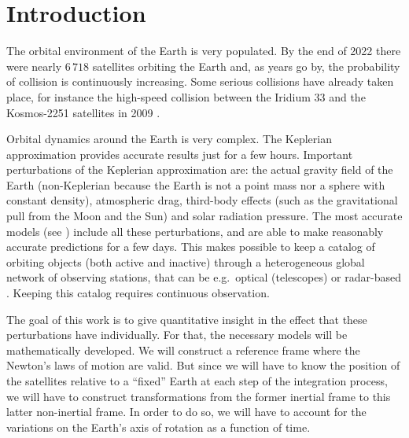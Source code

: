\documentclass[../main.tex]{subfiles}
\begin{document}
\section{Introduction}\label{sec:intro}

The orbital environment of the Earth is very populated. By the end of 2022 there were nearly $6\,718$ satellites orbiting the Earth \cite{num_sat} and, as years go by, the probability of collision is continuously increasing. Some serious collisions have already taken place, for instance the high-speed collision between the Iridium 33 and the Kosmos-2251 satellites in 2009 \cite{wiki:collision}.

Orbital dynamics around the Earth is very complex. The Keplerian approximation provides accurate results just for a few hours. Important perturbations of the Keplerian approximation are: the actual gravity field of the Earth (non-Keplerian because the Earth is not a point mass nor a sphere with constant density), atmospheric drag, third-body effects (such as the gravitational pull from the Moon and the Sun) and solar radiation pressure. The most accurate models (see \cite{sgp4OrbitDet}) include all these perturbations, and are able to make reasonably accurate predictions for a few days. This makes possible to keep a catalog of orbiting objects (both active and inactive) through a heterogeneous global network of observing stations, that can be e.g.\ optical (telescopes) or radar-based \cite{web:spacetrack,web:celestrak}. Keeping this catalog requires continuous observation.

The goal of this work is to give quantitative insight in the effect that these perturbations have individually. For that, the necessary models will be mathematically developed. We will construct a reference frame where the Newton's laws of motion are valid. But since we will have to know the position of the satellites relative to a ``fixed'' Earth at each step of the integration process, we will have to construct transformations from the former inertial frame to this latter non-inertial frame. In order to do so, we will have to account for the variations on the Earth's axis of rotation as a function of time.
\end{document}

